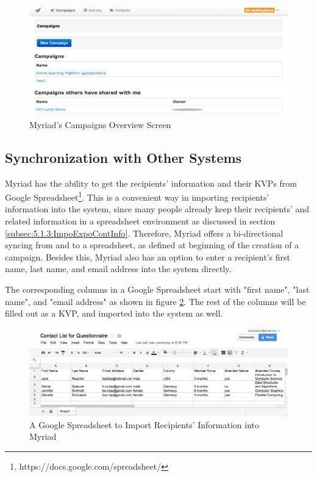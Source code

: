\begin{figure}[htbp]
	\centering
	\includegraphics[width=1.00\textwidth]{imgs/CampaignsOverviewScreen.png}
	\caption[Myriad's Campaigns Overview Screen]{Myriad's Campaigns Overview Screen}
	\label{fig:CampaignsOverviewScreen}
\end{figure}

\subsection{Synchronization with Other Systems}
\label{subsec:5.2.2:SyncOtheSyst}

Myriad has the ability to get the recipients' information and their \ac{KVP}s from Google Spreadsheet\footnote{https://docs.google.com/spreadsheet/}. This is a convenient way in importing recipients' information into the system, since many people already keep their recipients' and related information in a spreadsheet environment as discussed in section \ref{subsec:5.1.3:ImpoExpoContInfo}. Therefore, Myriad offers a bi-directional syncing from and to a spreadsheet, as defined at beginning of the creation of a campaign. Besides this, Myriad also has an option to enter a recipient's first name, last name, and email address into the system directly.
\vspace{1cm}

The corresponding columns in a Google Spreadsheet start with "first name", "last name", and "email address" as shown in figure \ref{fig:GoogleSpreadsheet}. The rest of the columns will be filled out as a \ac{KVP}, and imported into the system as well.

\begin{figure}[htbp]
	\centering
	\includegraphics[width=1.00\textwidth]{imgs/GoogleSpreadsheet.png}
	\caption[A Google Spreadsheet to Import Recipients' Information into Myriad]{A Google Spreadsheet to Import Recipients' Information into Myriad}
	\label{fig:GoogleSpreadsheet}
\end{figure}

